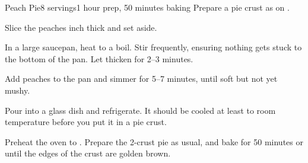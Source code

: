 \documentclass[../Cookbook.tex]{subfiles}
\begin{document}
\begin{recipe}[PeachPie]{Peach Pie}{8 servings}{1 hour prep, 50 minutes baking}
Prepare a pie crust as on .

Slice the peaches  inch thick and set aside.

In a large saucepan, heat to a boil. Stir frequently, ensuring nothing gets stuck to the bottom of the pan. Let thicken for 2--3 minutes.

Add peaches to the pan and simmer for 5--7 minutes, until soft but not yet mushy.

Pour into a glass dish and refrigerate. It should be cooled at least to room temperature before you put it in a pie crust.

Preheat the oven to . Prepare the 2-crust pie as usual, and bake for 50 minutes or until the edges of the crust are golden brown.

\end{recipe}
\end{document}
